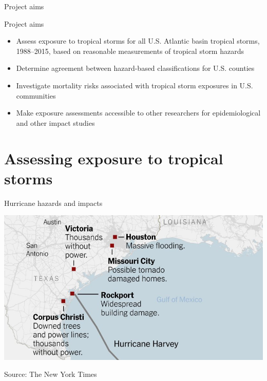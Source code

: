 \documentclass[ignorenonframetext,]{beamer}
\begin{document}
\begin{frame}{Project aims}

\begin{block}{Project aims}
\begin{itemize}
  \item Assess exposure to tropical storms for all U.S. Atlantic basin tropical storms, 1988--2015, based on reasonable measurements of tropical storm hazards
  \item Determine agreement between hazard-based classifications for U.S. counties
  \item Investigate mortality risks associated with tropical storm exposures in U.S. communities
  \item Make exposure assessments accessible to other researchers for epidemiological and other impact studies 
\end{itemize}
\end{block}

\end{frame}

\section{Assessing exposure to tropical
storms}\label{assessing-exposure-to-tropical-storms}

\begin{frame}{Hurricane hazards and impacts}

\begin{center}\includegraphics[width=\textwidth]{harvey_impacts} \end{center}

\footnotesize

Source: The New York Times

\end{frame}
\end{document}
